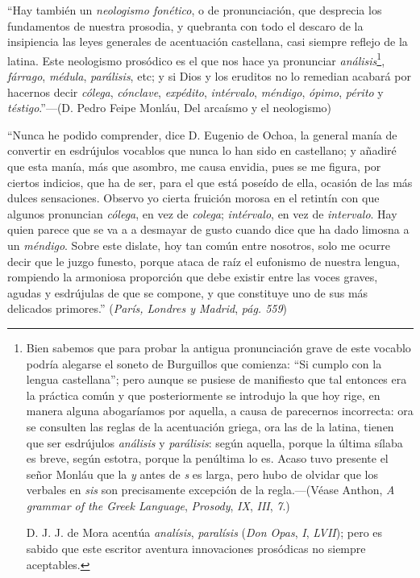\documentclass{article}
\begin{document}
``Hay también un \emph{neologismo fonético}, o de pronunciación, que desprecia los fundamentos de nuestra 
prosodia, y quebranta con todo el descaro de la insipiencia las leyes generales de acentuación 
castellana, casi siempre reflejo de la latina. Este neologismo prosódico es el que nos hace ya pronunciar 
\emph{análisis}\footnote{Bien sabemos que para probar la antigua pronunciación grave de este vocablo 
podría alegarse el soneto de Burguillos que comienza: ``Si cumplo con la lengua castellana''; pero aunque 
se pusiese de manifiesto que tal entonces era la práctica común y que posteriormente se introdujo la que 
hoy rige, en manera alguna abogaríamos por aquella, a causa de parecernos incorrecta: ora se consulten 
las reglas de la acentuación griega, ora las de la latina, tienen que ser esdrújulos \emph{análisis} y 
\emph{parálisis}: según aquella, porque la última sílaba es breve, según estotra, porque la penúltima lo 
es. Acaso tuvo presente el señor Monláu que la \emph{y} antes de \emph{s} es larga, pero hubo de olvidar 
que los verbales en \emph{sis} son precisamente excepción de la regla.---(Véase Anthon, \emph{A grammar 
of the Greek Language}, \emph{Prosody}, \emph{IX}, \emph{III}, \emph{7}.)

D. J. J. de Mora acentúa \emph{analísis}, \emph{paralísis} (\emph{Don Opas}, \emph{I}, \emph{LVII}); pero 
es sabido que este escritor aventura innovaciones prosódicas no siempre aceptables.}, \emph{fárrago}, 
\emph{médula}, \emph{parálisis}, etc; y si Dios y los eruditos no lo remedian acabará por hacernos decir 
\emph{cólega}, \emph{cónclave}, \emph{expédito}, \emph{intérvalo}, \emph{méndigo}, \emph{ópimo}, 
\emph{périto} y \emph{téstigo}.''---(D. Pedro Feipe Monláu, Del arcaísmo y el neologismo)

``Nunca he podido comprender, dice D. Eugenio de Ochoa, la general manía de convertir en esdrújulos 
vocablos que nunca lo han sido en castellano; y añadiré que esta manía, más que asombro, me causa 
envidia, pues se me figura, por ciertos indicios, que ha de ser, para el que está poseído de ella, 
ocasión de las más dulces sensaciones. Observo yo cierta fruición morosa en el retintín con que algunos 
pronuncian \emph{cólega}, en vez de \emph{colega}; \emph{intérvalo}, en vez de \emph{intervalo}. Hay 
quien parece que se va a a desmayar de gusto cuando dice que ha dado limosna a un \emph{méndigo}. Sobre 
este dislate, hoy tan común entre nosotros, solo me ocurre decir que le juzgo funesto, porque ataca de 
raíz el eufonismo de nuestra lengua, rompiendo la armoniosa proporción que debe existir entre las voces 
graves, agudas y esdrújulas de que se compone, y que constituye uno de sus más delicados primores.'' 
(\emph{París, Londres y Madrid}, \emph{pág. 559})
\end{document}
